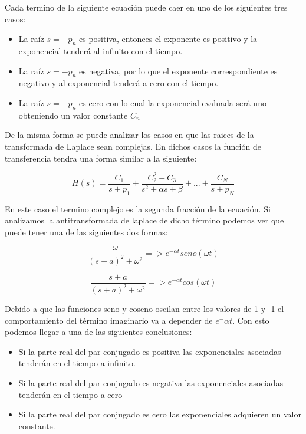 Cada termino de la siguiente ecuación puede caer en uno de los siguientes tres casos:

\begin{itemize}
\item La raíz $s=-p_n$ es positiva, entonces el exponente es positivo y la exponencial tenderá al infinito con el tiempo.
\item La raíz $s=-p_n$ es negativa, por lo que el exponente correspondiente es negativo y al exponencial tenderá a cero con el tiempo.
\item La raíz $s=-p_n$ es cero con lo cual la exponencial evaluada será uno obteniendo un valor constante $C_n$
\end{itemize}

De la misma forma se puede analizar los casos en que las raices de la transformada de Laplace sean complejas. En dichos casos la función de transferencia tendra una forma similar a la siguiente:

\begin{equation}
H(s)=\frac{C_1}{s+p_1}+\frac{C_2^2+C_3}{s^2+\alpha s+\beta}+...+\frac{C_N}{s+p_N}
\end{equation}

En este caso el termino complejo es la segunda fracción de la ecuación. Si analizamos la antitransformada de laplace de dicho término podemos ver que puede tener una de las siguientes dos formas:

\begin{equation}
\frac{\omega}{(s+a)^2+{\omega}^2} => e^{-\alpha t}seno(\omega t)
\end{equation}

\begin{equation}
\frac{s+a}{(s+a)^2+{\omega}^2} => e^{-\alpha t}cos(\omega t)
\end{equation}

Debido a que las funciones seno y coseno oscilan entre los valores de 1 y -1 el comportamiento del término imaginario va a depender de $e^-{\alpha t}$. Con esto podemos llegar a una de las siguientes conclusiones:

\begin{itemize}
\item Si la parte real del par conjugado es positiva las exponenciales asociadas tenderán en el tiempo a infinito.
\item Si la parte real del par conjugado es negativa las exponenciales asociadas tenderán en el tiempo a cero
\item Si la parte real del par conjugado es cero las exponenciales adquieren un valor constante.
\end{itemize}


